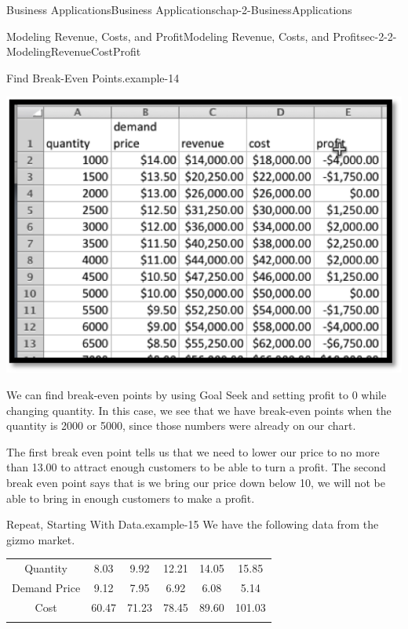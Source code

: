 \documentclass[oneside,10pt,]{book}
\numberwithin{equation}{section}
\newcommand{\hrulethin}  {\noalign{\hrule height 0.04em}}
\newcommand{\hrulemedium}{\noalign{\hrule height 0.07em}}
\newcommand{\hrulethick} {\noalign{\hrule height 0.11em}}
\begin{document}
\begin{chapterptx}{Business Applications}{}{Business Applications}{}{}{chap-2-BusinessApplications}
\begin{sectionptx}{Modeling Revenue, Costs, and Profit}{}{Modeling Revenue, Costs, and Profit}{}{}{sec-2-2-ModelingRevenueCostProfit}
\begin{example}{Find Break-Even Points.}{example-14}
\begin{sidebyside}{1}{0.2}{0.2}{0}
\begin{sbspanel}{0.6}
\includegraphics[width=1\linewidth]{images/sec2-2-8.png}
\end{sbspanel}%
\end{sidebyside}%
\par
\hypertarget{p-671}{}%
We can find break-even points by using Goal Seek and setting profit to 0 while changing quantity.  In this case, we see that we have break-even points when the quantity is 2000 or 5000, since those numbers were already on our chart.%
\par
\hypertarget{p-672}{}%
The first break even point tells us that we need to lower our price to no more than \textdollar{}13.00 to attract enough customers to be able to turn a profit.  The second break even point says that is we bring our price down below \textdollar{}10, we will not be able to bring in enough customers to make a profit.%
\end{example}
\begin{example}{Repeat, Starting With Data.}{example-15}%
\hypertarget{p-673}{}%
We have the following data from the gizmo market.%
\begin{sidebyside}{1}{0}{0}{0}%
\begin{sbspanel}{1}%
{\centering%
\begin{tabular}{cccccc}\hrulethick
Quantity&8.03&9.92&12.21&14.05&15.85\tabularnewline\hrulethin
Demand Price&\textdollar{}9.12&\textdollar{}7.95&\textdollar{}6.92&\textdollar{}6.08&\textdollar{}5.14\tabularnewline\hrulemedium
Cost&\textdollar{}60.47&\textdollar{}71.23&\textdollar{}78.45&\textdollar{}89.60&\textdollar{}101.03\tabularnewline\hrulemedium
\end{tabular}
\par}
\end{sbspanel}%

\end{sidebyside}
\end{example}
\end{sectionptx}
\end{chapterptx}
\end{document}
